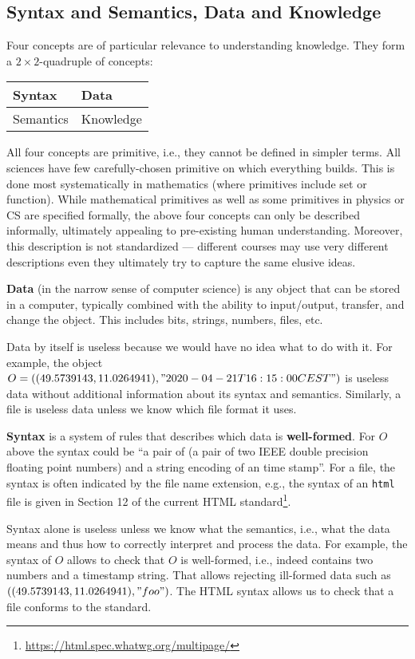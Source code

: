 \subsection{Syntax and Semantics, Data and Knowledge}

Four concepts are of particular relevance to understanding knowledge.
They form a $2\times 2$-quadruple of concepts:

\begin{center}
\begin{tabular}{l|l}
Syntax & Data \\
\hline
Semantics & Knowledge
\end{tabular}
\end{center}

All four concepts are primitive, i.e., they cannot be defined in simpler terms.
All sciences have few carefully-chosen primitive on which everything builds.
This is done most systematically in mathematics (where primitives include set or function).
While mathematical primitives as well as some primitives in physics or CS are specified formally, the above four concepts can only be described informally, ultimately appealing to pre-existing human understanding.
Moreover, this description is not standardized --- different courses may use very different descriptions even they ultimately try to capture the same elusive ideas.

\textbf{Data} (in the narrow sense of computer science) is any object that can be stored in a computer, typically combined with the ability to input/output, transfer, and change the object.
This includes bits, strings, numbers, files, etc.

Data by itself is useless because we would have no idea what to do with it.
For example, the object $O=((49.5739143, 11.0264941), "2020-04-21T16:15:00CEST")$ is useless data without additional information about its syntax and semantics.
Similarly, a file is useless data unless we know which file format it uses.

\textbf{Syntax} is a system of rules that describes which data is \textbf{well-formed}.
For $O$ above the syntax could be ``a pair of (a pair of two IEEE double precision floating point numbers) and a string encoding of an time stamp''. 
For a file, the syntax is often indicated by the file name extension, e.g., the syntax of an \texttt{html} file is given in Section 12 of the current HTML standard\footnote{\url{https://html.spec.whatwg.org/multipage/}}.

Syntax alone is useless unless we know what the semantics, i.e., what the data means and thus how to correctly interpret and process the data.
For example, the syntax of $O$ allows to check that $O$ is well-formed, i.e., indeed contains two numbers and a timestamp string.
That allows rejecting ill-formed data such as $((49.5739143, 11.0264941), "foo")$.
The HTML syntax allows us to check that a file conforms to the standard.

